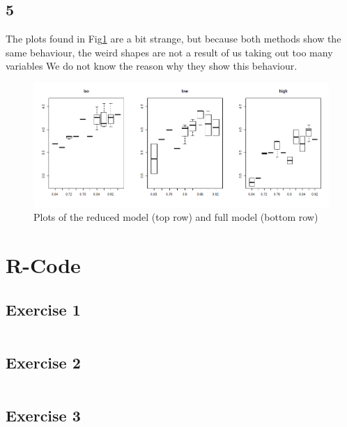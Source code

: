 \documentclass{article}
\begin{document}
    \subsection*{5}
      The plots found in Fig\ref{fig:3_5} are a bit strange, but because both methods show the same behaviour, the weird shapes are not a result of us taking out too many variables
      We do not know the reason why they show this behaviour.

      \begin{figure}[H]
          \centering
          \includegraphics[scale=0.3]{../results/diffThoraxActivity.png}
          \caption{Plots of the reduced model (top row) and full model (bottom row)}
          \label{fig:3_5}
      \end{figure}
    
  \section{R-Code}
    \subsection{Exercise 1}\label{sec:RE1}
      \begin{lstlisting}[language=R]
      \end{lstlisting}
    \subsection{Exercise 2}\label{sec:RE2}
      \begin{lstlisting}[language=R]
      \end{lstlisting}
    \subsection{Exercise 3}\label{sec:RE3}
      \begin{lstlisting}[language=R]
      \end{lstlisting}
\end{document}
